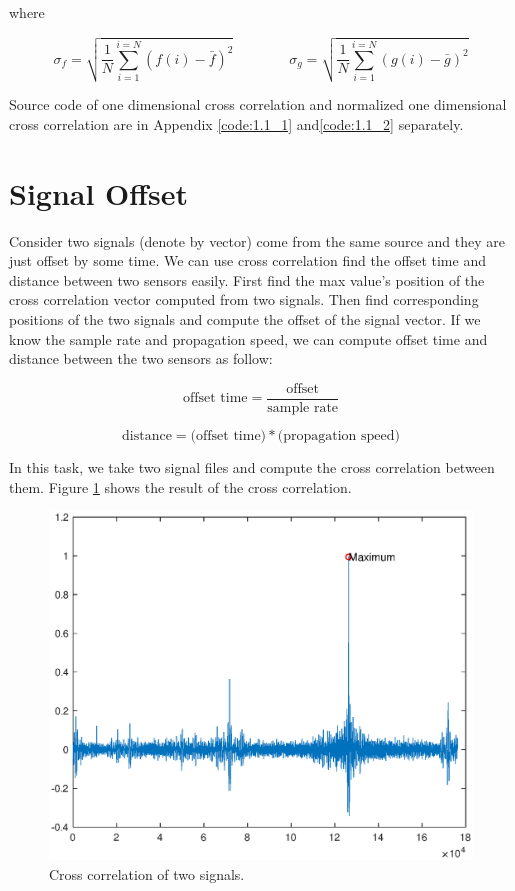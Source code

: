 where

\begin{equation*}
{\sigma _{f}}=
\sqrt{\frac{1}{N}\sum_{i=1}^{i=N}(f(i)-\bar{f})^{2}}
\hspace{4em}
{\sigma _{g}}=
\sqrt{\frac{1}{N}\sum_{i=1}^{i=N}(g(i)-\bar{g})^{2}}
\end{equation*}

Source code of one dimensional cross correlation and normalized one dimensional cross correlation are in Appendix \ref{code:1.1_1} and\ref{code:1.1_2} separately.


\section{Signal Offset}

Consider two signals (denote by vector) come from the same source and they are just offset by some time. We can use cross correlation find the offset time and distance between two sensors easily. First find the max value's position of the cross correlation vector computed from two signals. Then find corresponding positions of the two signals and compute the offset of the signal vector. If we know the sample rate and propagation speed, we can compute offset time and distance between the two sensors as follow:

\begin{equation*}
\text{offset time}=\frac{\text{offset}}{\text{sample rate}} 
\end{equation*}

\begin{equation*}
\text{distance}=\text{(offset time)} * \text{(propagation speed)}
\end{equation*}

In this task, we take two signal files and compute the cross correlation between them. Figure \ref{fig:crr_vis0} shows the result of the cross correlation. 

\begin{figure}[h!]
	\centering
		\includegraphics[width=0.45\linewidth]{figures/part1/crr_vis0.eps}
		\caption{Cross correlation of two signals.}
		\label{fig:crr_vis0}
\end{figure} 

